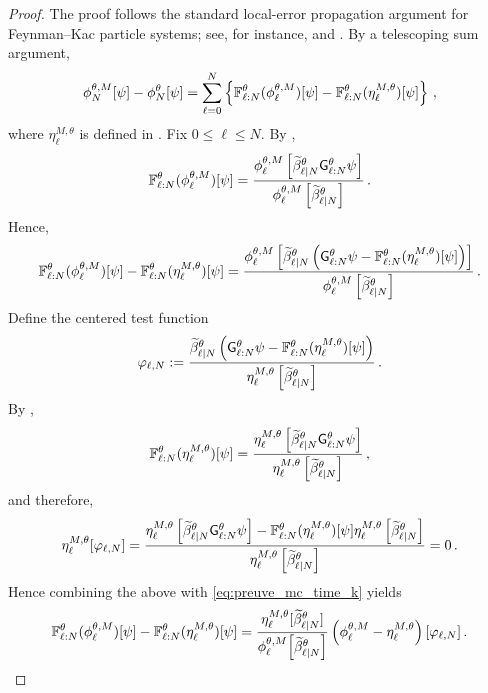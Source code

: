 \documentclass[11pt]{article}
\theoremstyle{plain}
\theoremstyle{definition}
\theoremstyle{remark}
\begin{document}
\begin{proof}
The proof follows the standard local-error propagation argument for Feynman--Kac particle systems; see, for instance, \citet[Section~7.4.3]{delmoral2004feynman} and \citet{whiteley2012sequential}. By a telescoping sum argument,
\begin{equation} \label{eq:preuve_mc_telescoping}
\mcfilter{N}[\psi]-\approxfilter{N}[\psi] = \sum_{\ell=0}^{N} \left\{ \filtertransform{\ell:N}[\theta](\mcfilter{\ell})[\psi] - \filtertransform{\ell:N}[\theta](\eta_\ell^{M,\theta})[\psi] \right\} \eqsp,
\end{equation}
where $\eta_\ell^{M,\theta}$ is defined in . Fix $0\le \ell\le N$. By , 
$$
\filtertransform{\ell:N}[\theta](\mcfilter{\ell} )[\psi] = \frac{ \mcfilter{\ell} \left[ \normbackwardfun{\ell}{N}[\theta] \prodfsmk{\ell}{N}[\theta]\psi \right] }{ \mcfilter{\ell} \left[ \normbackwardfun{\ell}{N}[\theta] \right]} \eqsp.
$$
Hence,
\begin{align} \label{eq:preuve_mc_time_k}
\filtertransform{\ell:N}[\theta](\mcfilter{\ell})[\psi] - \filtertransform{\ell:N}[\theta](\eta_\ell^{M,\theta})[\psi] = \frac{\mcfilter{\ell}\left[\normbackwardfun{\ell}{N}[\theta] \left( \prodfsmk{\ell}{N}[\theta]\psi-\filtertransform{\ell:N}[\theta](\eta_\ell^{M,\theta})[\psi] \right) \right] }{ \mcfilter{\ell} \left[ \normbackwardfun{\ell}{N}[\theta] \right] } \eqsp.
\end{align}
Define the centered test function
$$
\varphi_{\ell,N} \eqdef \frac{ \normbackwardfun{\ell}{N}[\theta] \left( \prodfsmk{\ell}{N}[\theta]\psi - \filtertransform{\ell:N}[\theta](\eta_\ell^{M,\theta})[\psi]
\right) }{ \eta_\ell^{M,\theta} \left[ \normbackwardfun{\ell}{N}[\theta]\right] } \eqsp.
$$
%
By ,
$$
\filtertransform{\ell:N}[\theta](\eta_\ell^{M,\theta})[\psi]
= \frac{ \eta_\ell^{M,\theta}\left[ \normbackwardfun{\ell}{N}[\theta] \prodfsmk{\ell}{N}[\theta]\psi\right]}{\eta_\ell^{M,\theta}\left[ \normbackwardfun{\ell}{N}[\theta]\right] } \eqsp,
$$
and therefore,
\begin{align*}
\eta_\ell^{M,\theta}[\varphi_{\ell,N}]
= \frac{ \eta_\ell^{M,\theta} \left[ \normbackwardfun{\ell}{N}[\theta]\prodfsmk{\ell}{N}[\theta]\psi\right]-\filtertransform{\ell:N}[\theta](\eta_\ell^{M,\theta})[\psi] \eta_\ell^{M,\theta} \left[ \normbackwardfun{\ell}{N}[\theta] \right] }{ \eta_\ell^{M,\theta} \left[ \normbackwardfun{\ell}{N}[\theta] \right] } = 0 \eqsp.
\end{align*}
Hence combining the above with \eqref{eq:preuve_mc_time_k} yields
\begin{align} \label{eq:preuve_mc_time_k2}
\filtertransform{\ell:N}[\theta](\mcfilter{\ell})[\psi] - \filtertransform{\ell:N}[\theta](\eta_\ell^{M,\theta})[\psi] 
=
\frac{ \eta_\ell^{M,\theta} [ \normbackwardfun{\ell}{N}[\theta] ] }{\mcfilter{\ell}[\normbackwardfun{\ell}{N}[\theta]]}\left(\mcfilter{\ell}-\eta_\ell^{M,\theta}\right) [ \varphi_{\ell,N} ] \eqsp.
\end{align}



\end{proof}
\end{document}
